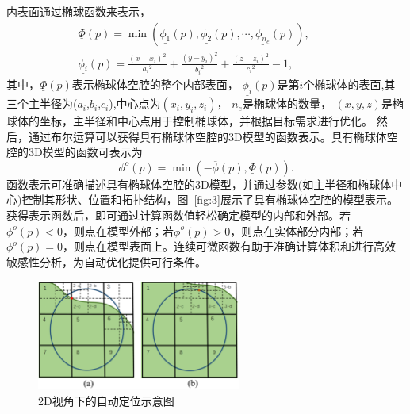 内表面通过椭球函数来表示，
\begin{equation}
  \begin{split}
      &\underline{\Phi}(p)=\min(\underline{\phi_{1}}(p), \underline{\phi_{2}}(p), \cdots, \underline{\phi_{n_e}}(p)),\qquad \quad
      \\
      &\underline{\phi_{i}}(p)=\frac{(x-x_{i})^2}{{a_i}^2}+\frac{(y-y_{i})^2}{{b_i}^2}+\frac{(z-z_{i})^2}{{c_i}^2}-1,
  \end{split}
  \label{eq:3}
\end{equation}
其中，$\underline{\Phi}(p)$表示椭球体空腔的整个内部表面，
$\underline{\phi_{i}}(p)$是第$i$个椭球体的表面,其三个主半径为($a_i$,$b_i$,$c_i$),中心点为$(x_{i},y_{i},z_{i})$，
${n_e}$是椭球体的数量，
$(x,y,z)$是椭球体的坐标，主半径和中心点用于控制椭球体，并根据目标需求进行优化。
然后，通过布尔运算可以获得具有椭球体空腔的3D模型的函数表示。具有椭球体空腔的3D模型的函数可表示为
\begin{equation}
  \phi^o(p)=\min(-\overline{\phi}(p), \underline{\Phi}(p) ). 
\end{equation}
函数表示可准确描述具有椭球体空腔的3D模型，并通过参数(如主半径和椭球体中心)控制其形状、位置和拓扑结构，图~\ref{fig:3}展示了具有椭球体空腔的模型表示。获得表示函数后，即可通过计算函数值轻松确定模型的内部和外部。若$\phi^o(p) < 0$，则点在模型外部；若$\phi^o(p) > 0$，则点在实体部分内部；若$\phi^o(p) = 0$，则点在模型表面上。连续可微函数有助于准确计算体积和进行高效敏感性分析，为自动优化提供可行条件。

\begin{figure}[t]
  \centering
  \includegraphics[width=0.6\textwidth]{./figures/self-support/fig6.png}
  \caption{2D视角下的自动定位示意图}
  \label{fig:5}
\end{figure}
